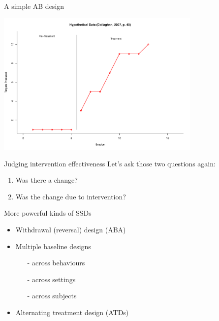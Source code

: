 \documentclass{beamer}
\begin{document}
% 
\begin{frame}{A simple AB design}
	\begin{center}
	\includegraphics[width=10cm]{SSD/ABplot.pdf}
	\end{center}
\end{frame}

% 
\begin{frame}{Judging intervention effectiveness}
Let's ask those two questions again:
	\begin{enumerate}
	\item Was there a change?
	\item Was the change due to intervention?
	\end{enumerate}
\end{frame}

% 
\begin{frame}{More powerful kinds of SSDs}
	\begin{itemize}
	\item Withdrawal (reversal) design (ABA)
	\item Multiple baseline designs
		\begin{itemize}
		\item[-] across behaviours
		\item[-] across settings
		\item[-] across subjects
		\end{itemize}
	\item Alternating treatment design (ATDs)
	\end{itemize}
\end{frame}
\end{document}
